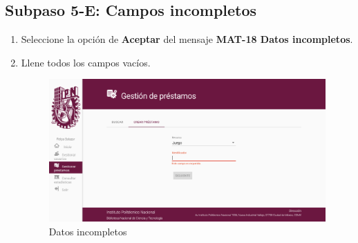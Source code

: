 \subsection{Subpaso 5-E: Campos incompletos}
\begin{enumerate}
	\item Seleccione la opción de \textbf{Aceptar} del mensaje
\textbf{MAT-18 Datos incompletos}.
	\item Llene todos los campos vacíos.
		  \begin{figure}[hbtp]
	\includegraphics[scale=0.3]{images/Interfaz/MAT-18 Datos incompletos.png}
	\caption{Datos incompletos}
	\end{figure}
\end{enumerate}
